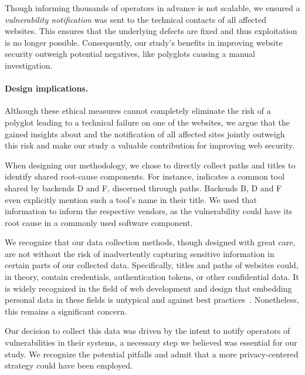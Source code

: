 Though informing thousands of operators in advance is not scalable, we ensured a \textit{vulnerability notification} was sent to the technical contacts of all affected websites.
This ensures that the underlying defects are fixed and thus exploitation is no longer possible. 
Consequently, our study's benefits in improving website security outweigh potential negatives, like polyglots causing a manual investigation. %

\vspace{-1em}
\paragraph{Design implications.} %


Although these ethical measures cannot completely eliminate the risk of a polyglot leading to a technical failure on one of the websites, we argue that the gained insights about \blindxss{} and the notification of all affected sites jointly outweigh this risk and make our study a valuable contribution for improving web security.

\smallskip{}When designing our methodology, we chose to directly collect paths and titles to identify shared root-cause components.
For instance,  indicates a common tool shared by backends D and F, discerned through paths.
Backends B, D and F even explicitly mention such a tool's name in their title.
We used that information to inform the respective vendors, as the vulnerability could have its root cause in a commonly used software component.

We recognize that our data collection methods, though designed with great care, are not without the risk of inadvertently capturing sensitive information in certain parts of our collected data.
Specifically, titles and paths of websites could, in theory, contain credentials, authentication tokens, or other confidential data. It is widely recognized in the field of web development and design that embedding personal data in these fields is untypical and against best practices~\citep[cf.][]{owasp-secure-design, cwe-598}.
Nonetheless, this remains a significant concern.

Our decision to collect this data was driven by the intent to notify operators of vulnerabilities in their systems, a necessary step we believed was essential for our study.
We recognize the potential pitfalls and admit that a more privacy-centered strategy could have been employed.

